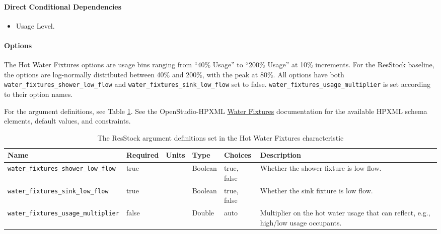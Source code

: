 \paragraph{Direct Conditional Dependencies}
\begin{itemize}
\item Usage Level.
\end{itemize}

\paragraph{Options}
The Hot Water Fixtures options are usage bins ranging from ``40\% Usage'' to ``200\% Usage'' at 10\% increments. For the ResStock baseline, the options are log-normally distributed between 40\% and 200\%, with the peak at 80\%. All options have both \texttt{water\_fixtures\_shower\_low\_flow} and
\texttt{water\_fixtures\_sink\_low\_flow} set to false. \texttt{water\_fixtures\_usage\_multiplier} is set according to their option names.

For the argument definitions, see Table \ref{table:hc_arg_def_hot_water_fix}. See the OpenStudio-HPXML \href{https://openstudio-hpxml.readthedocs.io/en/v1.8.1/workflow_inputs.html#hpxml-water-fixtures}{Water Fixtures} documentation for the available HPXML schema elements, default values, and constraints.

\begin{longtable}[]{|p{3.5cm}|p{1.5cm}|p{1cm}|p{1.1cm}|p{1.9cm}|p{5cm}|} \caption{The ResStock argument definitions set in the Hot Water Fixtures characteristic} \label{table:hc_arg_def_hot_water_fix} \\
\toprule\noalign{}
Name & Required & Units & Type & Choices & Description \\
\midrule\noalign{}
\endhead
\bottomrule\noalign{}
\endlastfoot
\texttt{water\_fixtures\_shower\_low\_flow} & true & & Boolean & true,
false & Whether the shower fixture is low flow. \\
\hline
\texttt{water\_fixtures\_sink\_low\_flow} & true & & Boolean & true,
false & Whether the sink fixture is low flow. \\
\hline
\texttt{water\_fixtures\_usage\_multiplier} & false & & Double & auto &
Multiplier on the hot water usage that can reflect, e.g., high/low usage
occupants. \\
\end{longtable}

